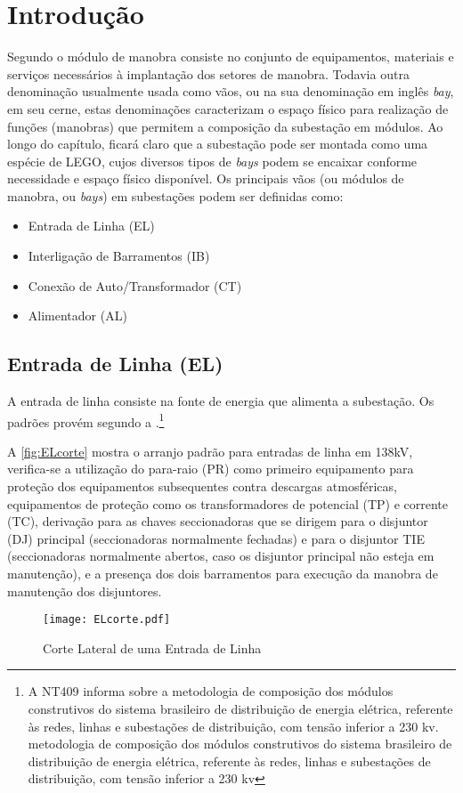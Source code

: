 	\section{Introdução}
		Segundo  o módulo de manobra consiste no conjunto de equipamentos, materiais e serviços necessários à implantação dos setores de manobra. Todavia outra denominação usualmente usada como vãos, ou na sua denominação em inglês \textit{bay}, em seu cerne, estas denominações caracterizam o espaço físico para realização de funções (manobras) que permitem a composição da subestação em módulos. Ao longo do capítulo, ficará claro que a subestação pode ser montada como uma espécie de LEGO, cujos diversos tipos de \textit{bays} podem se encaixar conforme necessidade e espaço físico disponível. Os principais vãos (ou módulos de manobra, ou \textit{bays}) em subestações podem ser definidas como:\par

		\begin{itemize}
			\item Entrada de Linha (EL)
			\item Interligação de Barramentos (IB)
			\item Conexão de Auto/Transformador (CT)
			\item Alimentador (AL)
			\end{itemize}
		\subsection{Entrada de Linha (EL)}
			A entrada de linha consiste na fonte de energia que alimenta a subestação. Os padrões provém segundo a .\footnote{A NT409 informa sobre a metodologia de composição dos módulos construtivos do sistema brasileiro de distribuição de energia elétrica, referente às redes, linhas e subestações de distribuição, com tensão inferior a 230 kv. metodologia de composição dos módulos construtivos do sistema brasileiro de distribuição de energia elétrica, referente às redes, linhas e subestações de distribuição, com tensão inferior a 230 kv}\par
			A \autoref{fig:ELcorte} mostra o arranjo padrão para entradas de linha em 138kV, verifica-se a utilização do para-raio (PR) como primeiro equipamento para proteção dos equipamentos subsequentes contra descargas atmosféricas, equipamentos de proteção como os transformadores de potencial (TP) e corrente (TC), derivação para as chaves seccionadoras que se dirigem para o disjuntor (DJ) principal (seccionadoras normalmente fechadas) e para o disjuntor TIE (seccionadoras normalmente abertos, caso os disjuntor principal não esteja em manutenção), e a presença dos dois barramentos para execução da manobra de manutenção dos disjuntores.\par
			\begin{figure}[!b]
				\caption{Corte Lateral de uma Entrada de Linha}
				\centering
				\texttt{[image: ELcorte.pdf]}
				\label{fig:ELcorte}
				\end{figure}
